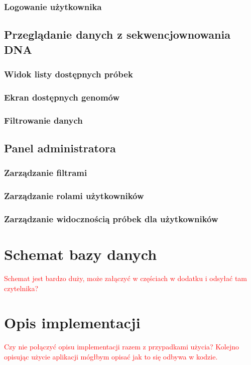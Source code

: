 \documentclass[a4paper,12pt,twoside]{article}
\begin{document}
\subsubsection{Logowanie użytkownika}

\subsection{Przeglądanie danych z sekwencjownowania DNA}
\subsubsection{Widok listy dostępnych próbek}
\subsubsection{Ekran dostępnych genomów}
\subsubsection{Filtrowanie danych}

\subsection{Panel administratora}
\subsubsection{Zarządzanie filtrami}
\subsubsection{Zarządzanie rolami użytkowników}
\subsubsection{Zarządzanie widocznością próbek dla użytkowników}

\newpage
\section{Schemat bazy danych}
\textcolor{red}{
Schemat jest bardzo duży, może załączyć w częściach w dodatku i odsyłać tam czytelnika?
}

\newpage
\section{Opis implementacji}  
\textcolor{red}{
Czy nie połączyć opisu implementacji razem z przypadkami użycia?
Kolejno opisując użycie aplikacji mógłbym opisać jak to się odbywa w kodzie.
}
\newpage
\end{document}
